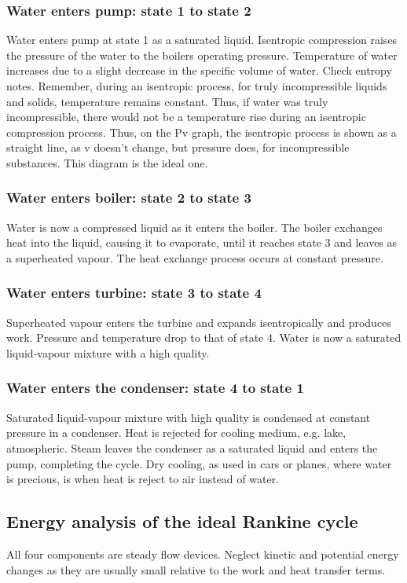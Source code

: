 \documentclass[class=report, crop=false, 12pt,a4paper]{standalone}
\begin{document}
\subsubsection{Water enters pump: state 1 to state 2}
Water enters pump at state 1 as a saturated liquid. Isentropic compression raises the pressure of the water to the boilers operating pressure. Temperature of water increases due to a slight decrease in the specific volume of water. Check entropy notes. Remember, during an isentropic process, for truly incompressible liquids and solids, temperature remains constant. Thus, if water was truly incompressible, there would not be a temperature rise during an isentropic compression process. Thus, on the Pv graph, the isentropic process is shown as a straight line, as v doesn't change, but pressure does, for incompressible substances. This diagram is the ideal one.
\subsubsection{Water enters boiler: state 2 to state 3}
Water is now a compressed liquid as it enters the boiler. The boiler exchanges heat into the liquid, causing it to evaporate, until it reaches state 3 and leaves as a superheated vapour. The heat exchange process occurs at constant pressure.
\subsubsection{Water enters turbine: state 3 to state 4}
Superheated vapour enters the turbine and expands isentropically and produces work. Pressure and temperature drop to that of state 4. Water is now a saturated liquid-vapour mixture with a high quality.
\subsubsection{Water enters the condenser: state 4 to state 1}
Saturated liquid-vapour mixture with high quality is condensed at constant pressure in a condenser. Heat is rejected for cooling medium, e.g. lake, atmospheric. Steam leaves the condenser as a saturated liquid and enters the pump, completing the cycle. Dry cooling, as used in cars or planes, where water is precious, is when heat is reject to air instead of water.
\subsection{Energy analysis of the ideal Rankine cycle}
All four components are steady flow devices. Neglect kinetic and potential energy changes as they are usually small relative to the work and heat transfer terms.
\end{document}
